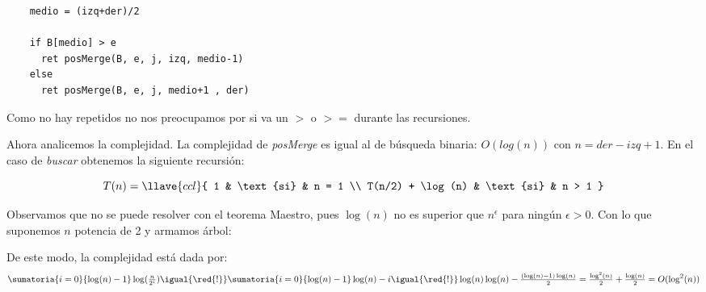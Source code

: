 \begin{enumerate}[label=\arabic*)]
\begin{tcolorbox}
\begin{lstlisting}
    medio = (izq+der)/2

    if B[medio] > e
      ret posMerge(B, e, j, izq, medio-1)
    else
      ret posMerge(B, e, j, medio+1 , der)
\end{lstlisting}
        \end{tcolorbox}

        Como no hay repetidos no nos preocupamos por si va un $>$ o $>=$ durante las recursiones.

        Ahora analicemos la complejidad. La complejidad de \textit{posMerge} es igual al de búsqueda binaria: $O(log(n))$
        con $n = der - izq + 1$. En el caso de \textit{buscar} obtenemos la siguiente recursión:

        $$
          T(n) =
          \llave{ccl}{
            1 & \text{si} & n = 1  \\
            T(n/2) + \log(n) & \text{si} & n > 1
          }
        $$

        Observamos que no se puede resolver con el teorema Maestro, pues $\log(n)$ no es superior que $n^{\epsilon}$ para ningún $\epsilon >0$.
        Con lo que suponemos $n$ potencia de 2 y armamos árbol:

        \begin{center}
        \end{center}

        De este modo, la complejidad está dada por:
        $$
          \textstyle
          \sumatoria{i=0}{\log(n) - 1} \log(\frac{n}{2^i}) \igual{\red{!}}
          \sumatoria{i=0}{\log(n) - 1} \log(n) - i \igual{\red{!}}
          \log(n)\log(n) - \frac{(\log(n)-1)\log(n)}{2} =
          \frac{\log^2(n)}{2} + \frac{\log(n)}{2} =
          O(\log^2(n))
        $$


\end{enumerate}
